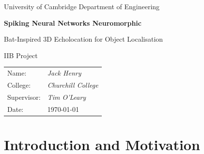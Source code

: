 \documentclass[12pt,a4paper]{report}
\begin{document}
\begin{titlepage}
  \centering
  \vspace*{2cm}
  {\Large University of Cambridge Department of Engineering\par}
  \vspace{1.5cm}
  {\Huge\bfseries Spiking Neural Networks Neuromorphic \par}
    \vspace{1.5cm}
  {\LARGE Bat-Inspired 3D Echolocation for Object Localisation \par}
  \vspace{1.5cm}
  {\Large IIB Project\par}
  \vfill
  \begin{tabular}{ll}
    Name: & \textit{Jack Henry}\\
    College: & \textit{Churchill College}\\
    Supervisor: & \textit{Tim O'Leary}\\
    Date: & \today
  \end{tabular}
\end{titlepage}






\clearpage

\tableofcontents



\clearpage


\chapter{Introduction and Motivation}


\appendix
\end{document}
